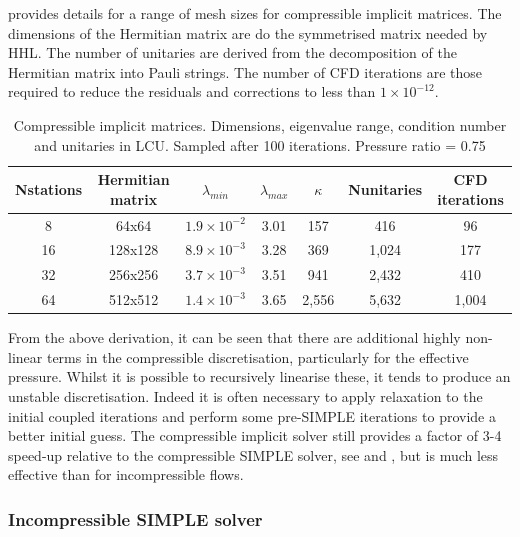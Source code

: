  provides details for a range of mesh sizes for
compressible implicit  matrices. The dimensions of the Hermitian matrix are do the symmetrised
matrix needed by HHL. The number of unitaries are derived from the decomposition of
the Hermitian matrix into Pauli strings.
The number of CFD iterations are those required to reduce the residuals and 
corrections to less than $1 \times 10^{-12}$.

\begin{table}[h]
  \centering
  \begin{tabular}{c c c c c c c}
    \toprule
    Nstations & Hermitian matrix &  $\lambda_{min}$ & $\lambda_{max}$ & $\kappa$ & Nunitaries & CFD iterations \\
    \midrule
     8   &   64x64     &$1.9\times10^{-2}$ & 3.01      & 157      & 416   &  96    \\  
     16  &  128x128    &$8.9\times10^{-3}$ & 3.28      & 369      & 1,024 &  177   \\  
     32  &  256x256    &$3.7\times10^{-3}$ & 3.51      & 941      & 2,432 &  410   \\  
     64  &  512x512    &$1.4\times10^{-3}$ & 3.65      & 2,556    & 5,632 &  1,004 \\
    \bottomrule
  \end{tabular}
  \caption{Compressible implicit matrices. 
           Dimensions, eigenvalue range, condition number and unitaries in LCU.
           Sampled after 100 iterations. Pressure ratio = 0.75}
  \label{tab-imp-comp}
\end{table}

From the above derivation, it can be seen that there are additional highly non-linear 
terms in the compressible discretisation, particularly for the effective pressure.
Whilst it is possible to recursively linearise these, it tends to produce an unstable
discretisation. Indeed it is often necessary to apply relaxation to the initial coupled 
iterations and perform some pre-SIMPLE iterations to provide a better initial guess. 
The compressible implicit solver still provides a factor of 3-4 speed-up relative to the 
compressible SIMPLE solver, see  and ,
but is much less effective than for incompressible flows.



\subsubsection{Incompressible SIMPLE solver}
\label{subsubsec-inco-simple}

